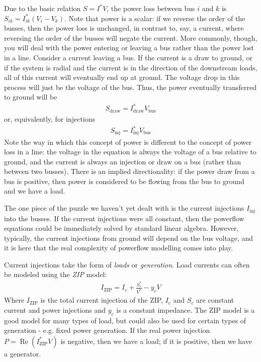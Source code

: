 \documentclass[11pt]{article}
\newcommand{\re}[1]{\ensuremath{\operatorname{Re}(#1)}}
\begin{document}
Due to the basic relation $S = I^*V$, the power loss between bus $i$ and $k$ is $S_{ik} = I_{ik}^*(V_i - V_k)$. Note that power is a scalar: if we reverse the order of the busses, then the power loss is unchanged, in contrast to, say, a current, where reversing the order of the busses will negate the current. More commonly, though, you will deal with the power entering or leaving a bus rather than the power lost in a line. Consider a current leaving a bus. If the current is a draw to ground, or if the system is radial and the current is in the direction of the downstream loads, all of this current will eventually end up at ground. The voltage drop in this process will just be the voltage of the bus. Thus, the power eventually transferred to ground will be 
\begin{align}
	S_\text{draw} = I_\text{draw}^*V_\text{bus}
\end{align}
or, equivalently, for injections
\begin{align}
	S_\text{inj} = I_\text{inj}^*V_\text{bus}
\end{align}
Note the way in which this concept of power is different to the concept of power loss in a line: the voltage in the equation is always the voltage of a bus relative to ground, and the current is always an injection or draw on a bus (rather than between two busses). There is an implied directionality: if the power draw from a bus is positive, then power is considered to be flowing from the bus to ground and we have a load.

The one piece of the puzzle we haven't yet dealt with is the current injections $I_\text{inj}$ into the busses. If the current injections were all constant, then the powerflow equations could be immediately solved by standard linear algebra. However, typically, the current injections from ground will depend on the bus voltage, and it is here that the real complexity of powerflow modelling comes into play.

Current injections take the form of \emph{loads} or \emph{generation}. Load currents can often be modeled using the \emph{ZIP} model:
\begin{align}
	I_\text{ZIP} = I_c + \frac{S^*_c}{V^*} - y_cV
\end{align}
Where $I_\text{ZIP}$ is the total current injection of the ZIP, $I_c$ and $S_c$ are constant current and power injections and $y_c$ is a constant impedance. The ZIP model is a good model for many types of load, but could also be used for certain types of generation - e.g. fixed power generation. If the real power injection $P = \re{I_\text{ZIP}^*V}$ is negative, then we have a load; if it is positive, then we have a generator.
\end{document}

